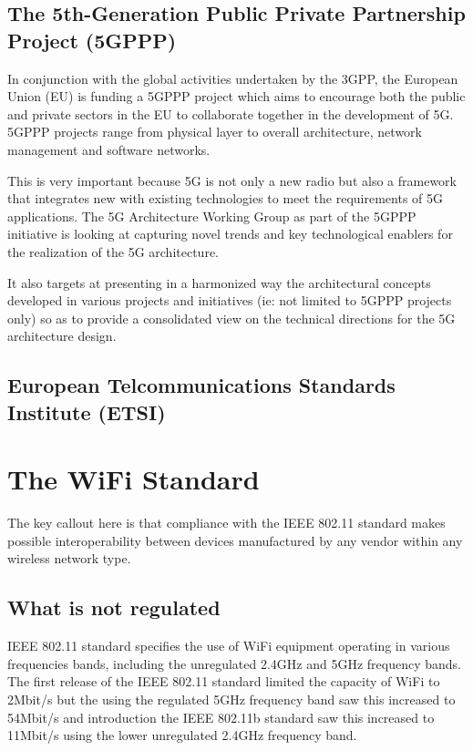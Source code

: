 \subsection{The 5th-Generation Public Private Partnership Project (5GPPP)}

In conjunction with the global activities undertaken by the 3GPP, the European Union (EU) is funding a 5GPPP project which aims to encourage both the public and private sectors in the EU to collaborate together in the development of 5G. 5GPPP projects range from physical layer to overall architecture, network management and software networks. 

This is very important because 5G is not only a new radio but also a framework that integrates new with existing technologies to meet the requirements of 5G applications. The 5G Architecture Working Group as part of the 5GPPP initiative is looking at capturing novel trends and key technological enablers for the realization of the 5G architecture. 

It also targets at presenting in a harmonized way the architectural concepts developed in various projects and initiatives (ie: not limited to 5GPPP projects only) so as to provide a consolidated view on the technical directions 
for the 5G architecture design.

\subsection{European Telcommunications Standards Institute (ETSI)}\label{ETSI}

\section{The WiFi Standard}

The key callout here is that compliance with the IEEE 802.11 standard makes possible interoperability between devices manufactured by any vendor within any wireless network type.

\subsection{What is not regulated}

IEEE 802.11 standard specifies the use of WiFi equipment operating in various frequencies bands, including the unregulated 2.4GHz and 5GHz frequency bands.  The first release of the IEEE 802.11 standard limited the capacity of WiFi to 2Mbit/s but the  using the regulated 5GHz frequency band saw this increased to 54Mbit/s and introduction the IEEE 802.11b standard saw this increased to 11Mbit/s using the lower unregulated 2.4GHz frequency band. 

